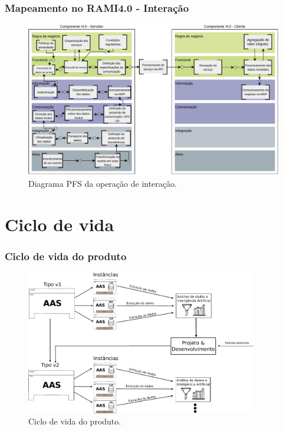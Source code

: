 \documentclass[10pt]{beamer}
\begin{document}
\begin{frame}
	
	\frametitle{Mapeamento no RAMI4.0 - Interação}
	
	\begin{figure}[htb]
		\centering
		\caption{Diagrama PFS da operação de interação.}
		\label{fig:rami-interacao}
		\includegraphics[width=1\textwidth]{rami-interacao}
	\end{figure}
	
\end{frame}

\section{Ciclo de vida}
\begin{frame}
	
	\frametitle{Ciclo de vida do produto}
	
	\begin{figure}[htb!]
		\centering
		\caption{Ciclo de vida do produto.}
		\label{fig:aas-lifecycle}
		\includegraphics[width=0.9\textwidth]{aas-lifecycle}
	\end{figure}
	
\end{frame}
\end{document}
